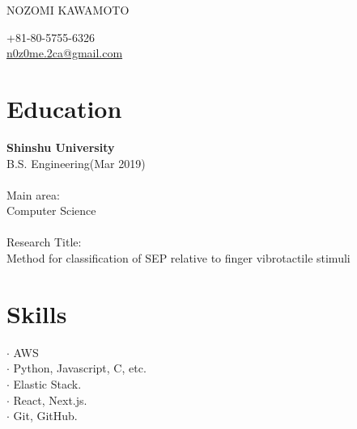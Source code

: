 \documentclass[11pt]{article} %
\begin{document}

\parbox[top][0.12\textheight][c]{\linewidth}{ %
	\vspace{-0.04\textheight} %
	{\color{name}\Huge NOZOMI KAWAMOTO}\\\medskip %
}

\begin{paracol}{2} %

{\faPhone} \hspace{1mm} +81-80-5755-6326 \\ %
{\small\faEnvelope} \hspace{1mm} \href{mailto:n0z0me.2ca@gmail.com}{\small n0z0me.2ca@gmail.com} \\ %

\vspace{1cm}

\section{\Large Education}
\textbf{\color{subtitle}\large Shinshu University}\\
B.S. Engineering(Mar 2019)\\
\\
Main area:\\
Computer Science\\
\\
Research Title:\\
Method for classification of SEP relative to finger vibrotactile stimuli\\

\vspace{1cm}

\section{\Large Skills}
$\cdot$ AWS\\
$\cdot$ Python, Javascript, C, etc.\\
$\cdot$ Elastic Stack.\\
$\cdot$ React, Next.js.\\
$\cdot$ Git, GitHub.\\


\end{paracol}
\end{document}
